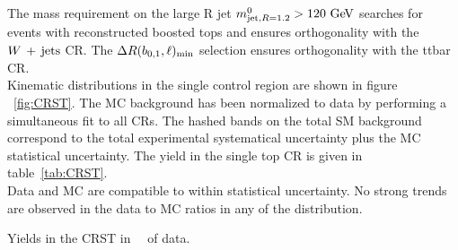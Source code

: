 \indent The mass requirement on the large R jet $\mantikttwelvezero > 120 \gev$ searches for events with reconstructed boosted tops and ensures orthogonality with the $W\,+\,\mathrm{jets}$ CR.  The $\Delta R(b_{0,1},\ell)_{\mathrm{min}}$ selection ensures orthogonality with the ttbar CR.  \\

\indent Kinematic distributions in the single control region are shown in figure ~\ref{fig:CRST}.  The MC background has been normalized to data by performing a simultaneous fit to all CRs.  The hashed bands on the total SM background correspond to the total experimental systematical uncertainty plus the MC statistical uncertainty.  The yield in the single top CR is given in table~\ref{tab:CRST}.  \\

\indent  Data and MC are compatible to within statistical uncertainty.  No strong trends are observed in the data to MC ratios in any of the distribution. \\

\begin{table}[!htb]
  \centering
  
  \caption{Yields in the CRST in \intlumi\ \ifb\ of data.  }
  \label{tab:CRST}
\end{table}

